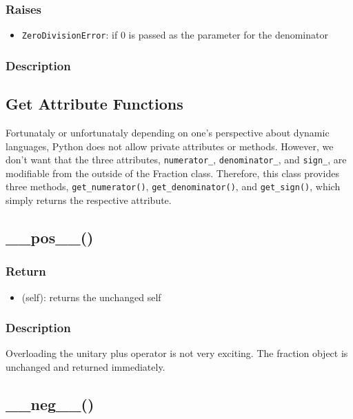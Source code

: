 \documentclass[refman]{scrartcl}
\begin{document}
\subsubsection*{Raises}

\begin{itemize}
  \item \texttt{ZeroDivisionError}: if \(0\) is passed as the parameter for the denominator
\end{itemize}

\subsubsection*{Description}

\subsection{Get Attribute Functions}

Fortunataly or unfortunataly depending on one's perspective about dynamic languages, Python does not allow private attributes or methods. However, we don't want that the three attributes, \texttt{numerator\_}, \texttt{denominator\_}, and \texttt{sign\_}, are modifiable from the outside of the Fraction class. Therefore, this class provides three methods, \texttt{get\_numerator()}, \texttt{get\_denominator()}, and \texttt{get\_sign()}, which simply returns the respective attribute.

\subsection{\_\_pos\_\_()}

\subsubsection*{Return}

\begin{itemize}
  \item (self): returns the unchanged self
\end{itemize}

\subsubsection*{Description}

Overloading the unitary plus operator is not very exciting. The fraction object is unchanged and returned immediately.

\subsection{\_\_neg\_\_()}
\end{document}
